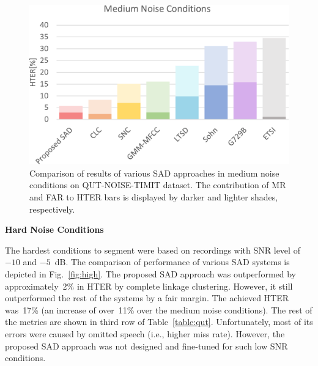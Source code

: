\documentclass[FM,noheader,EN,bwtitles]{tulthesis}
\begin{document}
\begin{figure}
\centering
\includegraphics[scale=0.5]{img/gMedium.pdf}
\caption{Comparison of results of various SAD approaches in medium noise conditions on QUT-NOISE-TIMIT dataset. The contribution of MR and FAR to HTER bars is displayed by darker and lighter shades, respectively.}
\label{fig:med}
\end{figure}

\bigskip
\noindent
\textbf{Hard Noise Conditions}
\medskip

\noindent
The hardest conditions to segment were based on recordings with SNR level of~$-10$ and $-5$~dB.
The comparison of performance of various SAD systems is depicted in Fig.~\ref{fig:high}.
The proposed SAD approach was outperformed by approximately~2\% in HTER by complete linkage clustering.
However, it still outperformed the rest of the systems by a fair margin.
The achieved HTER was~17\% (an increase of over~11\% over the medium noise conditions).
The rest of the metrics are shown in third row of Table~\ref{table:qut}.
Unfortunately, most of its errors were caused by omitted speech (i.e., higher miss rate).
However, the proposed SAD approach was not designed and fine-tuned for such low SNR conditions.

\end{document}

